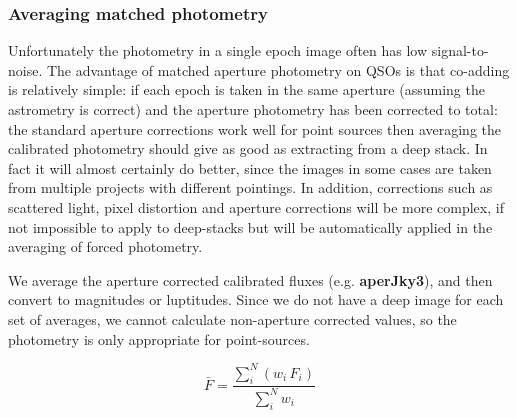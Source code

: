 \documentclass[usenatbib]{mnras}
\begin{document}
    \subsubsection{Averaging matched photometry}
    Unfortunately the photometry in a single epoch image often has low
    signal-to-noise. The advantage of matched aperture photometry on QSOs is that
    co-adding is relatively simple: if each epoch is taken in the same aperture
    (assuming the astrometry is correct) and the aperture photometry has been
    corrected to total: the standard aperture corrections work well for point
    sources then averaging the calibrated photometry should give as good as
    extracting from a deep stack. In fact it will almost certainly do better, since
    the images in some cases are taken from multiple projects with different
    pointings. In addition, corrections such as scattered light, pixel distortion
    and aperture corrections will be more complex, if not impossible to apply to
    deep-stacks but will be automatically applied in the averaging of forced
    photometry. 
    
    We average the aperture corrected calibrated fluxes (e.g. {\bf aperJky3}), and
    then convert to magnitudes or luptitudes. Since we do not have a deep image for
    each set of averages, we cannot calculate non-aperture corrected values, so the
    photometry is only appropriate for point-sources. 
    
    \begin{equation}
      \bar{F} = \frac{\sum_i^N (w_i\,F_i)}{\sum_i^N w_i}  
      \label{eq:avg}
    \end{equation}
    
\end{document}
